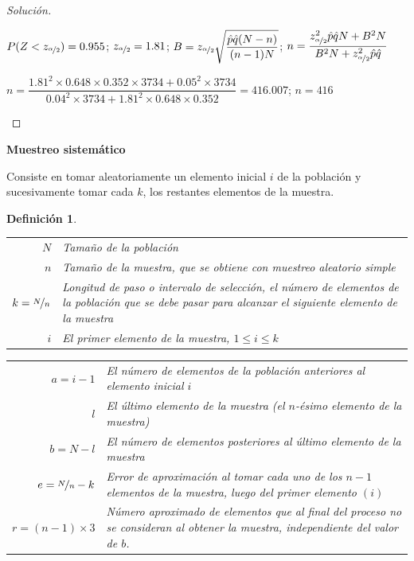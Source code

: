 \documentclass[a5paper,doc,10pt,noapacite]{apa6}
\newtheorem{definicion}{Definición}
\newcommand{\neodefi}[1]{%
	\vspace{1\baselineskip}
	\textbf{\small#1} \newline
}
\begin{document}
{{\begin{proof}[Solución]
\begin{APAenumerate}
		\(P(Z<z_{\nicefrac{\alpha}{2}})=0.955\); \(z_{\nicefrac{\alpha}{2}}=1.81\); \(B=z_{\nicefrac{\alpha}{2}}\sqrt{\dfrac{\hat{p}\hat{q}(N-n)}{(n-1)N}}\); \(n=\dfrac{z_{\nicefrac{\alpha}{2}}^2\hat{p}\hat{q}N+B^2N}{B^2N+z_{\nicefrac{\alpha}{2}}^2\hat{p}\hat{q}}\)
		
		\(n=\dfrac{1.81^2 \times 0.648 \times 0.352 \times 3734+0.05^2 \times 3734}{0.04^2 \times 3734+1.81^2 \times 0.648 \times 0.352}=416.007\); \(n=416\)		\qedhere
	\end{APAenumerate}
\end{proof}



%
%
%

\neodefi{Muestreo sistemático}

Consiste en tomar aleatoriamente un elemento inicial \(i\) de la población y sucesivamente tomar cada \(k\), los restantes elementos de la muestra.

\begin{definicion}\qquad
	
	\begin{table}[H]
	\fontsize{7.25}{11}\selectfont
	\raggedleft
	\begin{tabular}{r p{9cm} } 
		\(N\) & Tamaño de la población	 		\\     
		\(n\)    & Tamaño de la muestra, que se obtiene con muestreo aleatorio simple	\\
		\(k=\nicefrac{N}{n}\)    & Longitud de paso o intervalo de selección, el número de elementos de la población que se debe pasar para alcanzar el siguiente elemento de la muestra		\\
		\(i\)   	& El primer elemento de la muestra, \(1\leq i\leq k\)	\\
		\end{tabular}
	\end{table}
	\begin{table}[H]
	\fontsize{7.25}{11}\selectfont
	\raggedleft
	\begin{tabular}{r p{9cm} } 
		\(a=i-1\)    & El número de elementos de la población anteriores al elemento inicial \(i\)	\\
		\(l\)		& El último elemento de la muestra (el \(n\)-ésimo elemento de la muestra)	\\
		\(b=N-l\)	& El número de elementos posteriores al último elemento de la muestra		\\
		\(e=\nicefrac{N}{n}-k\) & Error de aproximación al tomar cada uno de los \(n-1\) elementos de la muestra, luego del primer elemento \((i)\)	\\
		\(r=(n-1) \times 3\) & Número aproximado de elementos que al final del proceso no se consideran al obtener la muestra, independiente del valor de \(b\).
	\end{tabular}
	\end{table}
\end{definicion}


}}
\end{document}
